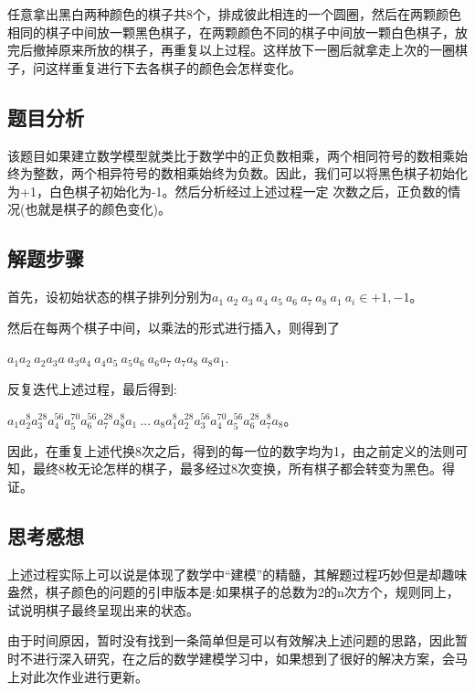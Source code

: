 \documentclass[UTF8]{ctexart}
\begin{document}
  任意拿出黑白两种颜色的棋子共8个，排成彼此相连的一个圆圈，然后在两颗颜色相同的棋子中间放一颗黑色棋子，在两颗颜色不同的棋子中间放一颗白色棋子，放完后撤掉原来所放的棋子，再重复以上过程。这样放下一圈后就拿走上次的一圈棋子，问这样重复进行下去各棋子的颜色会怎样变化。

  \subsection{题目分析}
  该题目如果建立数学模型就类比于数学中的正负数相乘，两个相同符号的数相乘始终为整数，两个相异符号的数相乘始终为负数。因此，我们可以将黑色棋子初始化为+1，白色棋子初始化为-1。然后分析经过上述过程一定 次数之后，正负数的情况(也就是棋子的颜色变化)。

  \subsection{解题步骤}
  首先，设初始状态的棋子排列分别为$a_1\ a_2\ a_3\ a_4\ a_5\ a_6\ a_7\ a_8\ a_1\ a_i\in {+1,-1}$。

  然后在每两个棋子中间，以乘法的形式进行插入，则得到了

  $a_1a_2\ a_2a_3a\ a_3a_4\ a_4a_5\ a_5a_6\ a_6a_7\ a_7a_8\ a_8a_1$.

  反复迭代上述过程，最后得到: 

  $a_1a_2^8a_3^28a_4^56a_5^70a_6^56a_7^28a_8^8a_1\ ... \ a_8a_1^8a_2^28a_3^56a_4^70a_5^56a_6^28a_7^8a_8$。

  因此，在重复上述代换8次之后，得到的每一位的数字均为1，由之前定义的法则可知，最终8枚无论怎样的棋子，最多经过8次变换，所有棋子都会转变为黑色。得证。

  \subsection{思考感想}
  上述过程实际上可以说是体现了数学中“建模”的精髓，其解题过程巧妙但是却趣味盎然，棋子颜色的问题的引申版本是:如果棋子的总数为2的n次方个，规则同上，试说明棋子最终呈现出来的状态。

  由于时间原因，暂时没有找到一条简单但是可以有效解决上述问题的思路，因此暂时不进行深入研究，在之后的数学建模学习中，如果想到了很好的解决方案，会马上对此次作业进行更新。
\end{document}
